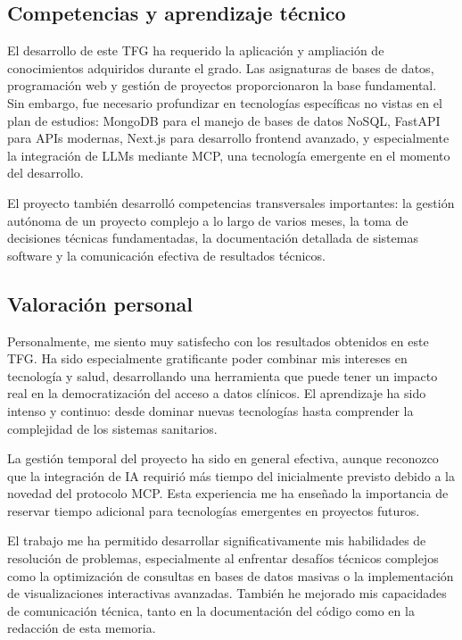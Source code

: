 \subsection{Competencias y aprendizaje técnico}

El desarrollo de este TFG ha requerido la aplicación y ampliación de conocimientos adquiridos durante el grado. Las asignaturas de bases de datos, programación web y gestión de proyectos proporcionaron la base fundamental. Sin embargo, fue necesario profundizar en tecnologías específicas no vistas en el plan de estudios: MongoDB para el manejo de bases de datos NoSQL, FastAPI para APIs modernas, Next.js para desarrollo frontend avanzado, y especialmente la integración de LLMs mediante MCP, una tecnología emergente en el momento del desarrollo.

El proyecto también desarrolló competencias transversales importantes: la gestión autónoma de un proyecto complejo a lo largo de varios meses, la toma de decisiones técnicas fundamentadas, la documentación detallada de sistemas software y la comunicación efectiva de resultados técnicos.

\subsection{Valoración personal}

Personalmente, me siento muy satisfecho con los resultados obtenidos en este TFG. Ha sido especialmente gratificante poder combinar mis intereses en tecnología y salud, desarrollando una herramienta que puede tener un impacto real en la democratización del acceso a datos clínicos. El aprendizaje ha sido intenso y continuo: desde dominar nuevas tecnologías hasta comprender la complejidad de los sistemas sanitarios.

La gestión temporal del proyecto ha sido en general efectiva, aunque reconozco que la integración de IA requirió más tiempo del inicialmente previsto debido a la novedad del protocolo MCP. Esta experiencia me ha enseñado la importancia de reservar tiempo adicional para tecnologías emergentes en proyectos futuros.

El trabajo me ha permitido desarrollar significativamente mis habilidades de resolución de problemas, especialmente al enfrentar desafíos técnicos complejos como la optimización de consultas en bases de datos masivas o la implementación de visualizaciones interactivas avanzadas. También he mejorado mis capacidades de comunicación técnica, tanto en la documentación del código como en la redacción de esta memoria.

